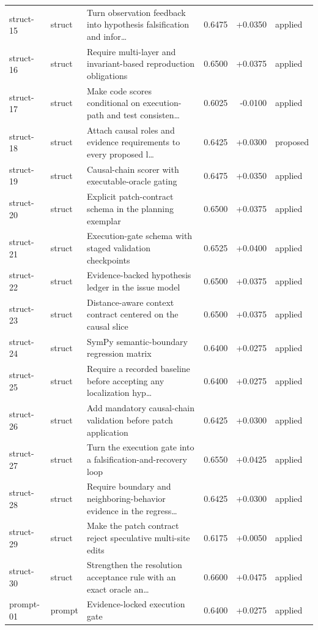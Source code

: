 \begin{center}
\begin{longtable}{llp{5.2cm}rrl}
struct-15 & struct & Turn observation feedback into hypothesis falsification and infor\ldots{} & 0.6475 & +0.0350 & applied \\
struct-16 & struct & Require multi-layer and invariant-based reproduction obligations & 0.6500 & +0.0375 & applied \\
struct-17 & struct & Make code scores conditional on execution-path and test consisten\ldots{} & 0.6025 & -0.0100 & applied \\
struct-18 & struct & Attach causal roles and evidence requirements to every proposed l\ldots{} & 0.6425 & +0.0300 & proposed \\
struct-19 & struct & Causal-chain scorer with executable-oracle gating & 0.6475 & +0.0350 & applied \\
struct-20 & struct & Explicit patch-contract schema in the planning exemplar & 0.6500 & +0.0375 & applied \\
struct-21 & struct & Execution-gate schema with staged validation checkpoints & 0.6525 & +0.0400 & applied \\
struct-22 & struct & Evidence-backed hypothesis ledger in the issue model & 0.6500 & +0.0375 & applied \\
struct-23 & struct & Distance-aware context contract centered on the causal slice & 0.6500 & +0.0375 & applied \\
struct-24 & struct & SymPy semantic-boundary regression matrix & 0.6400 & +0.0275 & applied \\
struct-25 & struct & Require a recorded baseline before accepting any localization hyp\ldots{} & 0.6400 & +0.0275 & applied \\
struct-26 & struct & Add mandatory causal-chain validation before patch application & 0.6425 & +0.0300 & applied \\
struct-27 & struct & Turn the execution gate into a falsification-and-recovery loop & 0.6550 & +0.0425 & applied \\
struct-28 & struct & Require boundary and neighboring-behavior evidence in the regress\ldots{} & 0.6425 & +0.0300 & applied \\
struct-29 & struct & Make the patch contract reject speculative multi-site edits & 0.6175 & +0.0050 & applied \\
struct-30 & struct & Strengthen the resolution acceptance rule with an exact oracle an\ldots{} & 0.6600 & +0.0475 & applied \\
prompt-01 & prompt & Evidence-locked execution gate & 0.6400 & +0.0275 & applied \\

\end{longtable}
\end{center}
